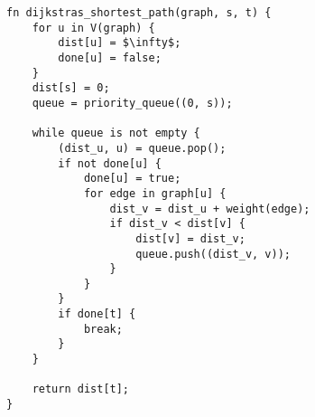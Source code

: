 \begin{lstlisting}[caption={Dijkstra's Algorithm for Shortest Path},label=Listing,mathescape=true]
fn dijkstras_shortest_path(graph, s, t) {
    for u in V(graph) {
        dist[u] = $\infty$;
        done[u] = false;
    }
    dist[s] = 0;
    queue = priority_queue((0, s));

    while queue is not empty {
        (dist_u, u) = queue.pop();
        if not done[u] {
            done[u] = true;
            for edge in graph[u] {
                dist_v = dist_u + weight(edge);
                if dist_v < dist[v] {
                    dist[v] = dist_v;
                    queue.push((dist_v, v));
                }
            }
        }
        if done[t] { 
            break; 
        }
    }

    return dist[t];
}
\end{lstlisting}
